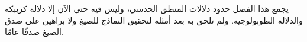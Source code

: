 \documentclass[../../../include/open-logic-chapter]{subfiles}
\begin{document}

\begin{editorial}
  يجمع هذا الفصل حدود دلالات المنطق الحدسي، وليس فيه حتى الآن إلا دلالة
  كريبكه والدلالة الطوبولوجية. ولم تلحق به بعد أمثلة لتحقيق النماذج للصيغ
  ولا براهين على صدق الصيغ صدقًا عامًا.
\end{editorial}


\OLEndChapterHook
\end{document}

